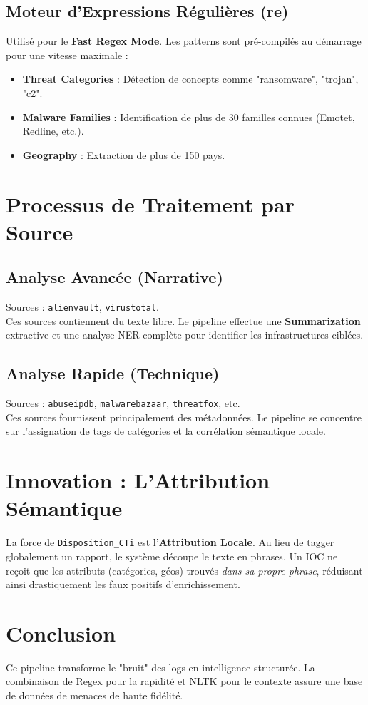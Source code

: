 \documentclass[12pt,a4paper]{article}
\begin{document}
\subsection{Moteur d'Expressions Régulières (re)}
Utilisé pour le \textbf{Fast Regex Mode}. Les patterns sont pré-compilés au démarrage pour une vitesse maximale :
\begin{itemize}
    \item \textbf{Threat Categories} : Détection de concepts comme "ransomware", "trojan", "c2".
    \item \textbf{Malware Families} : Identification de plus de 30 familles connues (Emotet, Redline, etc.).
    \item \textbf{Geography} : Extraction de plus de 150 pays.
\end{itemize}

\section{Processus de Traitement par Source}

\subsection{Analyse Avancée (Narrative)}
Sources : \texttt{alienvault}, \texttt{virustotal}.
\\ Ces sources contiennent du texte libre. Le pipeline effectue une \textbf{Summarization} extractive et une analyse NER complète pour identifier les infrastructures ciblées.

\subsection{Analyse Rapide (Technique)}
Sources : \texttt{abuseipdb}, \texttt{malwarebazaar}, \texttt{threatfox}, etc.
\\ Ces sources fournissent principalement des métadonnées. Le pipeline se concentre sur l'assignation de tags de catégories et la corrélation sémantique locale.

\section{Innovation : L'Attribution Sémantique}
La force de \texttt{Disposition\_CTi} est l'\textbf{Attribution Locale}. Au lieu de tagger globalement un rapport, le système découpe le texte en phrases. Un IOC ne reçoit que les attributs (catégories, géos) trouvés \textit{dans sa propre phrase}, réduisant ainsi drastiquement les faux positifs d'enrichissement.

\section{Conclusion}
Ce pipeline transforme le "bruit" des logs en intelligence structurée. La combinaison de Regex pour la rapidité et NLTK pour le contexte assure une base de données de menaces de haute fidélité.
\end{document}
